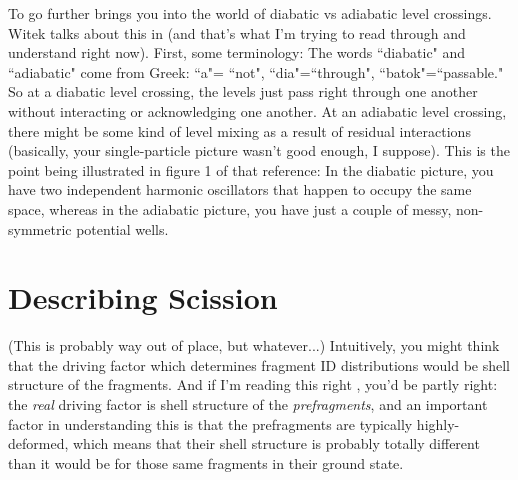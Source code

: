 To go further brings you into the world of diabatic vs adiabatic level crossings. Witek talks about this in \cite{Nazarewicz1993} (and that's what I'm trying to read through and understand right now). First, some terminology: The words ``diabatic" and ``adiabatic" come from Greek: ``a"= ``not", ``dia"=``through", ``batok"=``passable." So at a diabatic level crossing, the levels just pass right through one another without interacting or acknowledging one another. At an adiabatic level crossing, there might be some kind of level mixing as a result of residual interactions (basically, your single-particle picture wasn't good enough, I suppose). This is the point being illustrated in figure 1 of that reference: In the diabatic picture, you have two independent harmonic oscillators that happen to occupy the same space, whereas in the adiabatic picture, you have just a couple of messy, non-symmetric potential wells.

\section{Describing Scission}

(This is probably way out of place, but whatever...) Intuitively, you might think that the driving factor which determines fragment ID distributions would be shell structure of the fragments. And if I'm reading this right \cite[2nd paragraph + references]{Mcdonnell2014}, you'd be partly right: the \textit{real} driving factor is shell structure of the \textit{prefragments}, and an important factor in understanding this is that the prefragments are typically highly-deformed, which means that their shell structure is probably totally different than it would be for those same fragments in their ground state.